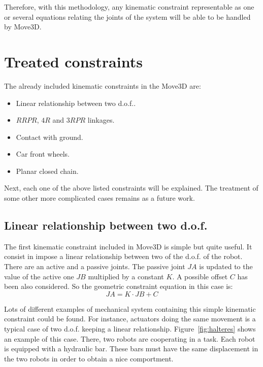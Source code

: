 Therefore, with this methodology, any kinematic constraint
representable as one or several equations relating the joints of the
system will be able to be handled by Move3D.


\section{Treated constraints}

The already included  kinematic constraints in the Move3D 
are:

\begin{itemize}
\item Linear relationship between two d.o.f..
\item $RRPR$, $4R$ and $3RPR$ linkages.
\item Contact with ground.
\item Car front wheels.
\item Planar closed chain.
\end{itemize}

Next, each one of the above listed constraints will be explained.  The
treatment of some other more complicated cases remains as a future
work.


\subsection*{Linear relationship between two d.o.f.}

The first kinematic constraint included in Move3D is
simple but quite useful. It consist in impose a linear relationship
between two of the d.o.f. of the robot. There are an active and a
passive joints. The passive joint $JA$ is updated to the value of the
active one $JB$ multiplied by a constant $K$. A possible offset $C$
has been also considered. So the geometric constraint equation in this
case is:
\[JA = K \cdot JB + C\]


Lots of different examples of mechanical system containing this simple 
kinematic constraint could be found. For instance, actuators doing 
the same movement is a typical case of two d.o.f. keeping a linear
relationship. Figure~\ref{fig:halteres} shows an example of this
case. There, two robots are cooperating in a task. Each robot is
equipped with a hydraulic bar. These bars must have the same
displacement in the two robots in order to obtain a nice
comportment.


